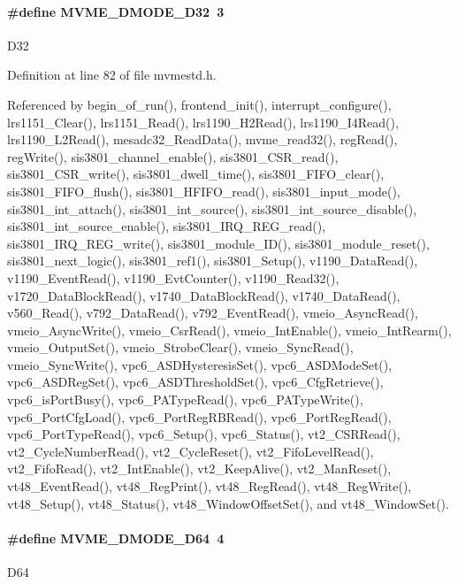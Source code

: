 \paragraph[{MVME\_\-DMODE\_\-D32}]{\setlength{\rightskip}{0pt plus 5cm}\#define MVME\_\-DMODE\_\-D32~3}\hfill\label{group__mvmestdinclude_ga1106eeff8cdbd2cfb5516f7feea8c1ff}
D32 

Definition at line 82 of file mvmestd.h.

Referenced by begin\_\-of\_\-run(), frontend\_\-init(), interrupt\_\-configure(), lrs1151\_\-Clear(), lrs1151\_\-Read(), lrs1190\_\-H2Read(), lrs1190\_\-I4Read(), lrs1190\_\-L2Read(), mesadc32\_\-ReadData(), mvme\_\-read32(), regRead(), regWrite(), sis3801\_\-channel\_\-enable(), sis3801\_\-CSR\_\-read(), sis3801\_\-CSR\_\-write(), sis3801\_\-dwell\_\-time(), sis3801\_\-FIFO\_\-clear(), sis3801\_\-FIFO\_\-flush(), sis3801\_\-HFIFO\_\-read(), sis3801\_\-input\_\-mode(), sis3801\_\-int\_\-attach(), sis3801\_\-int\_\-source(), sis3801\_\-int\_\-source\_\-disable(), sis3801\_\-int\_\-source\_\-enable(), sis3801\_\-IRQ\_\-REG\_\-read(), sis3801\_\-IRQ\_\-REG\_\-write(), sis3801\_\-module\_\-ID(), sis3801\_\-module\_\-reset(), sis3801\_\-next\_\-logic(), sis3801\_\-ref1(), sis3801\_\-Setup(), v1190\_\-DataRead(), v1190\_\-EventRead(), v1190\_\-EvtCounter(), v1190\_\-Read32(), v1720\_\-DataBlockRead(), v1740\_\-DataBlockRead(), v1740\_\-DataRead(), v560\_\-Read(), v792\_\-DataRead(), v792\_\-EventRead(), vmeio\_\-AsyncRead(), vmeio\_\-AsyncWrite(), vmeio\_\-CsrRead(), vmeio\_\-IntEnable(), vmeio\_\-IntRearm(), vmeio\_\-OutputSet(), vmeio\_\-StrobeClear(), vmeio\_\-SyncRead(), vmeio\_\-SyncWrite(), vpc6\_\-ASDHysteresisSet(), vpc6\_\-ASDModeSet(), vpc6\_\-ASDRegSet(), vpc6\_\-ASDThresholdSet(), vpc6\_\-CfgRetrieve(), vpc6\_\-isPortBusy(), vpc6\_\-PATypeRead(), vpc6\_\-PATypeWrite(), vpc6\_\-PortCfgLoad(), vpc6\_\-PortRegRBRead(), vpc6\_\-PortRegRead(), vpc6\_\-PortTypeRead(), vpc6\_\-Setup(), vpc6\_\-Status(), vt2\_\-CSRRead(), vt2\_\-CycleNumberRead(), vt2\_\-CycleReset(), vt2\_\-FifoLevelRead(), vt2\_\-FifoRead(), vt2\_\-IntEnable(), vt2\_\-KeepAlive(), vt2\_\-ManReset(), vt48\_\-EventRead(), vt48\_\-RegPrint(), vt48\_\-RegRead(), vt48\_\-RegWrite(), vt48\_\-Setup(), vt48\_\-Status(), vt48\_\-WindowOffsetSet(), and vt48\_\-WindowSet().
\paragraph[{MVME\_\-DMODE\_\-D64}]{\setlength{\rightskip}{0pt plus 5cm}\#define MVME\_\-DMODE\_\-D64~4}\hfill\label{group__mvmestdinclude_ga072f6459693256bff0c351153baf6dc5}
D64 

